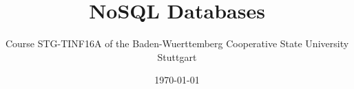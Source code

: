 \documentclass[
  12pt,
  a4paper,
  parskip,
  openany
]{scrbook}
\title{NoSQL Databases}
\author{Course STG-TINF16A of the Baden-Wuerttemberg Cooperative State University Stuttgart}
\date{\today}
\begin{document}
\maketitle
\tableofcontents


\printglossaries













\printbibliography

\appendix


\end{document}
